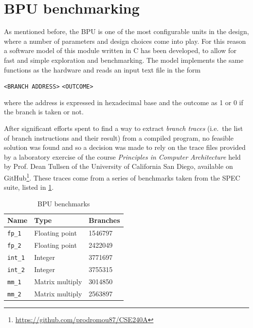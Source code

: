 \section{\acs{BPU} benchmarking}
As mentioned before, the \ac{BPU} is one of the most configurable units in the design, where a number of parameters and design choices come into play. For this reason a software model of this module written in C has been developed, to allow for fast and simple exploration and benchmarking. The model implements the same functions as the hardware and reads an input text file in the form
\begin{center}
  \texttt{<BRANCH ADDRESS>}  \texttt{<OUTCOME>}
\end{center}
where the address is expressed in hexadecimal base and the outcome as 1 or 0 if the branch is taken or not.

After significant efforts spent to find a way to extract \emph{branch traces} (i.e.\ the list of branch instructions and their result) from a compiled program, no feasible solution was found and so a decision was made to rely on the trace files provided by a laboratory exercise of the course \emph{Principles in Computer Architecture} held by Prof. Dean Tullsen of the University of California San Diego, available on GitHub\footnote{\url{https://github.com/prodromou87/CSE240A}}. These traces come from a series of benchmarks taken from the SPEC suite, listed in \ref{tab:benchmarks}.
\begin{table}[hbt]
  \centering
  \begin{tabular}{lll}
    \toprule
    \textbf{Name}   & \textbf{Type}    & \textbf{Branches}  \\ \midrule
    \texttt{fp\_1}  & Floating point   & \num{1546797}      \\ \midrule
    \texttt{fp\_2}  & Floating point   & \num{2422049}      \\ \midrule
    \texttt{int\_1} & Integer          & \num{3771697}      \\ \midrule
    \texttt{int\_2} & Integer          & \num{3755315}      \\ \midrule
    \texttt{mm\_1}  & Matrix multiply  & \num{3014850}      \\ \midrule
    \texttt{mm\_2}  & Matrix multiply  & \num{2563897}      \\
    \bottomrule
  \end{tabular}
  \caption{\acs{BPU} benchmarks}
  \label{tab:benchmarks}
\end{table}

